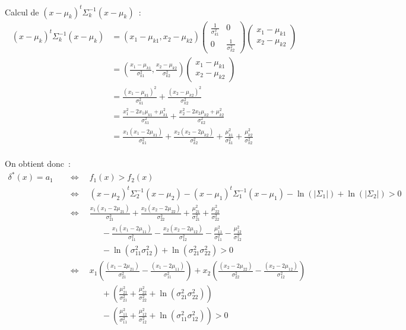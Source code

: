 \documentclass[a4paper,10pt]{report}
\begin{document}
Calcul de $ (x - \mu_k)^t \Sigma_k^{-1} (x - \mu_k) $~:
\begin{align*}
(x - \mu_k)^t \Sigma_k^{-1} (x - \mu_k) 
&= ( x_1 - \mu_{k1}, x_2 - \mu_{k2}) \begin{pmatrix} \frac{1}{\sigma_{k1}^2} & 0 \\ 0 & \frac{1}{\sigma_{k2}^2} \end{pmatrix} \begin{pmatrix} x_1 - \mu_{k1} \\ x_2 - \mu_{k2} \end{pmatrix} \\
&=  \left( \frac{x_1 - \mu_{k1}}{\sigma_{k1}^2} , \frac{x_2 - \mu_{k2}}{\sigma_{k2}^2} \right) \begin{pmatrix} x_1 - \mu_{k1} \\ x_2 - \mu_{k2} \end{pmatrix} \\
&=   \frac{(x_1 - \mu_{k1})^2}{\sigma_{k1}^2} + \frac{(x_2 - \mu_{k2})^2}{\sigma_{k2}^2} \\
&= \frac{x_1^2 - 2x_1\mu_{k1} + \mu_{k1}^2}{\sigma_{k1}^2}
	+ \frac{x_2^2 - 2x_2\mu_{k2} + \mu_{k2}^2}{\sigma_{k2}^2} \\
&= \frac{x_1(x_1 - 2\mu_{k1})}{\sigma_{k1}^2}
	+ \frac{x_2(x_2 - 2\mu_{k2})}{\sigma_{k2}^2}
	+ \frac{\mu_{k1}^2}{\sigma_{k1}^2}
	+ \frac{\mu_{k2}^2}{\sigma_{k2}^2} \\
\end{align*}



On obtient donc~:
\begin{align*}
\delta^*(x) = a_1 \quad 
&\Leftrightarrow \quad f_1(x) > f_2(x) \\
&\Leftrightarrow \quad (x - \mu_2)^t \Sigma_2^{-1} (x - \mu_2) - (x - \mu_1)^t \Sigma_1^{-1} (x - \mu_1) - \ln(|\Sigma_1|) + \ln(|\Sigma_2|) > 0 \\
&\Leftrightarrow \quad 
	\frac{x_1(x_1 - 2\mu_{21})}{\sigma_{21}^2}
	+ \frac{x_2(x_2 - 2\mu_{22})}{\sigma_{22}^2}
	+ \frac{\mu_{21}^2}{\sigma_{21}^2}
	+ \frac{\mu_{22}^2}{\sigma_{22}^2} \\
&\qquad \qquad 
	- \frac{x_1(x_1 - 2\mu_{11})}{\sigma_{11}^2}
	- \frac{x_2(x_2 - 2\mu_{12})}{\sigma_{12}^2}
	- \frac{\mu_{11}^2}{\sigma_{11}^2}
	- \frac{\mu_{12}^2}{\sigma_{12}^2} \\
&\qquad \qquad - \ln(\sigma_{11}^2 \sigma_{12}^2) + \ln(\sigma_{21}^2 \sigma_{22}^2) > 0 \\
&\Leftrightarrow \quad 
	x_1 \left( 
		\frac{(x_1 - 2\mu_{21})}{\sigma_{21}^2} 
		- \frac{(x_1 - 2\mu_{11})}{\sigma_{11}^2}
	\right)
	+ x_2 \left( 
		\frac{(x_2 - 2\mu_{22})}{\sigma_{22}^2}
		- \frac{(x_2 - 2\mu_{12})}{\sigma_{12}^2}
	\right) \\
	&\qquad \qquad + \left(  
		\frac{\mu_{21}^2}{\sigma_{21}^2} 
		+ \frac{\mu_{22}^2}{\sigma_{22}^2} 
		+ \ln(\sigma_{21}^2 \sigma_{22}^2) 
	\right) \\
	&\qquad \qquad - \left(  
		\frac{\mu_{11}^2}{\sigma_{11}^2} 
		+ \frac{\mu_{12}^2}{\sigma_{12}^2} 
		+ \ln(\sigma_{11}^2 \sigma_{12}^2)
	\right) > 0
\end{align*}
\end{document}
